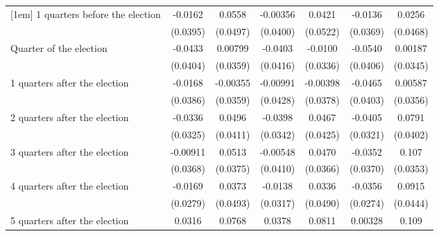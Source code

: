 \begin{table}[htbp]
\begin{tabular}{l*{6}{c}}
[1em]
 1 quarters before the election&     -0.0162         &      0.0558         &    -0.00356         &      0.0421         &     -0.0136         &      0.0256         \\
                    &    (0.0395)         &    (0.0497)         &    (0.0400)         &    (0.0522)         &    (0.0369)         &    (0.0468)         \\
[1em]
Quarter of the election&     -0.0433         &     0.00799         &     -0.0403         &     -0.0100         &     -0.0540         &     0.00187         \\
                    &    (0.0404)         &    (0.0359)         &    (0.0416)         &    (0.0336)         &    (0.0406)         &    (0.0345)         \\
[1em]
 1 quarters after the election&     -0.0168         &    -0.00355         &    -0.00991         &    -0.00398         &     -0.0465         &     0.00587         \\
                    &    (0.0386)         &    (0.0359)         &    (0.0428)         &    (0.0378)         &    (0.0403)         &    (0.0356)         \\
[1em]
 2 quarters after the election&     -0.0336         &      0.0496         &     -0.0398         &      0.0467         &     -0.0405         &      0.0791\sym{*}  \\
                    &    (0.0325)         &    (0.0411)         &    (0.0342)         &    (0.0425)         &    (0.0321)         &    (0.0402)         \\
[1em]
 3 quarters after the election&    -0.00911         &      0.0513         &    -0.00548         &      0.0470         &     -0.0352         &       0.107\sym{**} \\
                    &    (0.0368)         &    (0.0375)         &    (0.0410)         &    (0.0366)         &    (0.0370)         &    (0.0353)         \\
[1em]
 4 quarters after the election&     -0.0169         &      0.0373         &     -0.0138         &      0.0336         &     -0.0356         &      0.0915\sym{*}  \\
                    &    (0.0279)         &    (0.0493)         &    (0.0317)         &    (0.0490)         &    (0.0274)         &    (0.0444)         \\
[1em]
 5 quarters after the election&      0.0316         &      0.0768\sym{*}  &      0.0378         &      0.0811\sym{*}  &     0.00328         &       0.109\sym{**} \\

\end{tabular}
\end{table}
